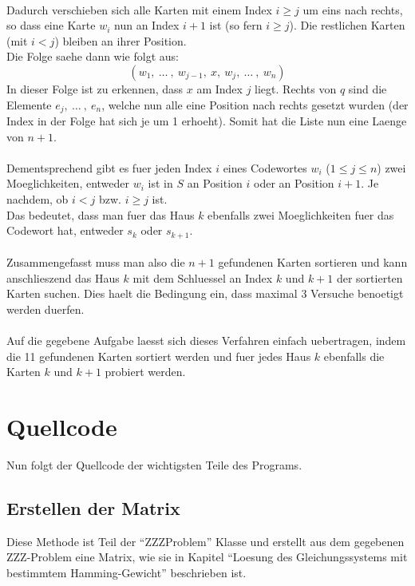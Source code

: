 \documentclass[a4paper,10pt,ngerman]{scrartcl}
\begin{document}
{\\Dadurch verschieben sich alle Karten mit einem Index $i \geq j$ um eins nach rechts, so dass eine Karte $w_i$ nun an Index $i+1$ ist (so fern $i \geq j$). Die restlichen Karten (mit $i < j$) bleiben an ihrer Position.\\
Die Folge saehe dann wie folgt aus:
$$(w_1, \ \dots \ , \ w_{j-1}, \ x, \ w_{j}, \ \dots \ , \ w_n)$$
In dieser Folge ist zu erkennen, dass $x$ am Index $j$ liegt. Rechts von $q$ sind die Elemente $e_{j}, \ \dots \ , \ e_n$, welche nun alle eine Position nach rechts  gesetzt wurden (der Index in der Folge hat sich je um 1 erhoeht). Somit hat die Liste nun eine Laenge von $n+1$.
\\\\
Dementsprechend gibt es fuer jeden Index $i$ eines Codewortes $w_i$ ($1 \leq j \leq n$) zwei Moeglichkeiten, entweder $w_i$ ist in $S$ an Position $i$ oder an Position $i+1$.
Je nachdem, ob $i < j$ bzw. $i \geq j$ ist.\\
Das bedeutet, dass man fuer das Haus $k$ ebenfalls zwei Moeglichkeiten fuer das Codewort hat, entweder $s_k$ oder $s_{k+1}$. 
\\\\
Zusammengefasst muss man also die $n+1$ gefundenen Karten sortieren und kann anschlieszend das Haus $k$ mit dem Schluessel an Index $k$ und $k+1$ der sortierten Karten suchen. Dies haelt die Bedingung ein, dass maximal 3 Versuche benoetigt werden duerfen.
\\\\
Auf die gegebene Aufgabe laesst sich dieses Verfahren einfach uebertragen, indem die 11 gefundenen Karten sortiert werden und fuer jedes Haus $k$ ebenfalls die Karten $k$ und $k+1$ probiert werden. 

\section{Quellcode}
Nun folgt der Quellcode der wichtigsten Teile des Programs.

\subsection{Erstellen der Matrix}
Diese Methode ist Teil der "`ZZZProblem"' Klasse und erstellt aus dem gegebenen ZZZ-Problem eine Matrix,  wie sie in Kapitel "`Loesung des Gleichungssystems mit bestimmtem Hamming-Gewicht"' beschrieben ist.

}
\end{document}
